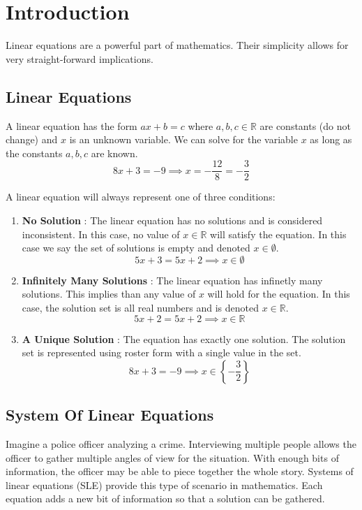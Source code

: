 \section*{Introduction}
Linear equations are a powerful part of mathematics.  Their simplicity allows for very straight-forward implications.

\subsection*{Linear Equations}
A linear equation has the form $ax+b=c$ where $a,b,c \in \mathbb{R}$ are constants (do not change) and $x$ is an unknown variable. We can solve for the variable $x$ as long as the constants $a,b,c$ are known.
$$8x+3 = -9 \implies x = -\frac{12}{8} = -\frac{3}{2}$$

A linear equation will always represent one of three conditions:
\begin{enumerate}
    \item \textbf{No Solution} : The linear equation has no solutions and  is considered inconsistent. In this case, no value of $x \in \mathbb{R}$ will satisfy the equation.  In this case we say the set of solutions is empty and denoted $x \in \emptyset$. $$5x+3 = 5x+2 \implies x \in \emptyset$$
    \item \textbf{Infinitely Many Solutions} : The linear equation has infinetly many solutions.  This implies than any value of $x$ will hold for the equation.  In this case, the solution set is all real numbers and is denoted $x \in \mathbb{R}$.   $$5x +2 = 5x+2 \implies x \in \mathbb{R}$$
    \item \textbf{A Unique Solution} : The equation has exactly one solution. The solution set is represented using roster form with a single value in the set.$$8x+3 = -9 \implies x \in \left\{ -\frac{3}{2} \right\}$$
\end{enumerate}

\subsection*{System Of Linear Equations}
Imagine a police officer  analyzing a crime. Interviewing multiple people allows the officer to gather multiple angles of view for the situation.  With enough bits of information, the officer may be able to piece together the whole story.  Systems of linear equations (SLE) provide this type of scenario in mathematics.  Each equation adds a new bit of information so that a solution can be gathered.  

